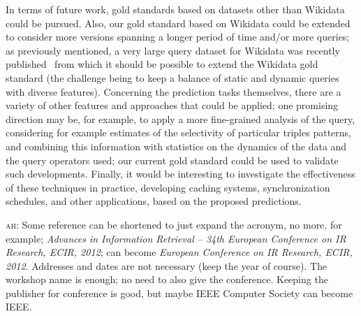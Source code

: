 \documentclass[runningheads]{llncs}
\newcommand{\ah}[1]{{\color{blue}\textsc{ah:} #1}}
\begin{document}
In terms of future work, gold standards based on datasets other than Wikidata could be pursued. Also, our gold standard based on Wikidata could be extended to consider more versions spanning a longer period of time and/or more queries; as previously mentioned, a very large query dataset for Wikidata was recently published~\cite{MalyshevKGGB18} from which it should be possible to extend the Wikidata gold standard (the challenge being to keep a balance of static and dynamic queries with diverse features). Concerning the prediction tasks themselves, there are a variety of other features and approaches that could be applied; one promising direction may be, for example, to apply a more fine-grained analysis of the query, considering for example estimates of the selectivity of particular triples patterns, and combining this information with statistics on the dynamics of the data and the query operators used; our current gold standard could be used to validate such developments. Finally, it would be interesting to investigate the effectiveness of these techniques in practice, developing caching systems, synchronization schedules, and other applications, based on the proposed predictions.

\ah{Some reference can be shortened to just expand the acronym, no more, for example; \textit{Advances in Information Retrieval -- 34th European Conference on IR Research, ECIR, 2012}; can become \textit{European Conference on IR Research, ECIR, 2012}. Addresses and dates are not necessary (keep the year of course). The workshop name is enough; no need to also give the conference. Keeping the publisher for conference is good, but maybe IEEE Computer Society can become IEEE.}




\end{document}
